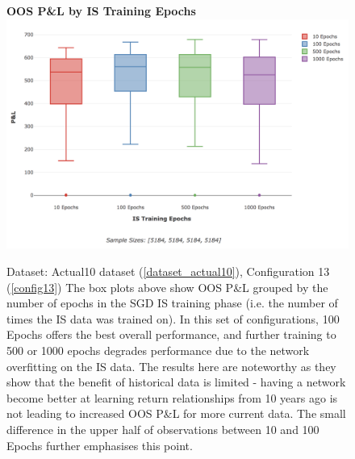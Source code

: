 \documentclass[a4paper,11pt,oneside]{article}
\theoremstyle{plain}
\theoremstyle{definition}
\begin{document}
	\begin{figure}[H]
		\centering 
		\textbf{OOS P\&L by IS Training Epochs}
		\includegraphics[scale=0.4]{images/results/data/max_epochs.png}
		\caption[OOS P\&L by IS Training Epochs]
		{
			Dataset: Actual10 dataset (\ref{dataset_actual10}), Configuration 13 (\ref{config13}) 
			\newline The box plots above show OOS P\&L grouped by the number of epochs in the SGD IS training phase (i.e. the number of times the IS data was trained on). In this set of configurations, 100 Epochs offers the best overall performance, and further training to 500 or 1000 epochs degrades performance due to the network overfitting on the IS data. The results here are noteworthy as they show that the benefit of historical data is limited - having a network become better at learning return relationships from 10 years ago is not leading to increased OOS P\&L for more current data. The small difference in the upper half of observations between 10 and 100 Epochs further emphasises this point.
		}
		\label{figure-results_pl_max_epochs}
	\end{figure}
	
\end{document}
